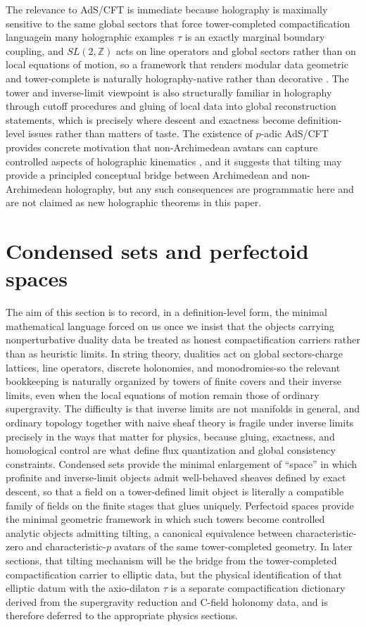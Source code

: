 \documentclass[11pt]{article}
\theoremstyle{remark}
\newcommand{\Z}{\mathbb{Z}}
\begin{document}
The relevance to AdS/CFT is immediate because holography is maximally sensitive to the same global sectors that force tower-completed compactification language\:in many holographic examples \(\tau\) is an exactly marginal boundary coupling, and \(SL(2,\Z)\) acts on line operators and global sectors rather than on local equations of motion, so a framework that renders modular data geometric and tower-complete is naturally holography-native rather than decorative \cite{Schwarz1995, Sen1994}. The tower and inverse-limit viewpoint is also structurally familiar in holography through cutoff procedures and gluing of local data into global reconstruction statements, which is precisely where descent and exactness become definition-level issues rather than matters of taste. The existence of \(p\)-adic AdS/CFT provides concrete motivation that non-Archimedean avatars can capture controlled aspects of holographic kinematics \cite{Gubser2017, Heydeman2018}, and it suggests that tilting may provide a principled conceptual bridge between Archimedean and non-Archimedean holography, but any such consequences are programmatic here and are not claimed as new holographic theorems in this paper.

\section{Condensed sets and perfectoid spaces}\label{sec:toolkit}
The aim of this section is to record, in a definition-level form, the minimal mathematical language forced on us once we insist that the objects carrying nonperturbative duality data be treated as honest compactification carriers rather than as heuristic limits. In string theory, dualities act on global sectors-charge lattices, line operators, discrete holonomies, and monodromies-so the relevant bookkeeping is naturally organized by towers of finite covers and their inverse limits, even when the local equations of motion remain those of ordinary supergravity. The difficulty is that inverse limits are not manifolds in general, and ordinary topology together with naive sheaf theory is fragile under inverse limits precisely in the ways that matter for physics, because gluing, exactness, and homological control are what define flux quantization and global consistency constraints. Condensed sets provide the minimal enlargement of ``space'' in which profinite and inverse-limit objects admit well-behaved sheaves defined by exact descent, so that a field on a tower-defined limit object is literally a compatible family of fields on the finite stages that glues uniquely. Perfectoid spaces provide the minimal geometric framework in which such towers become controlled analytic objects admitting tilting, a canonical equivalence between characteristic-zero and characteristic-\(p\) avatars of the same tower-completed geometry. In later sections, that tilting mechanism will be the bridge from the tower-completed compactification carrier to elliptic data, but the physical identification of that elliptic datum with the axio-dilaton \(\tau\) is a separate compactification dictionary derived from the supergravity reduction and C-field holonomy data, and is therefore deferred to the appropriate physics sections.
\end{document}
